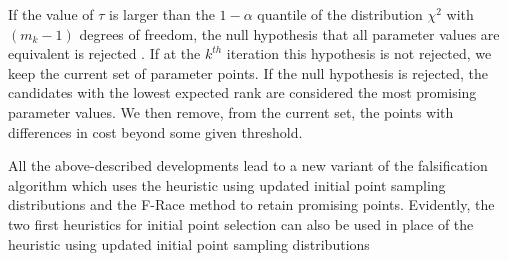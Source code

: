 If the value of $\tau$ is larger than the $1 - \alpha$ quantile of the distribution $\chi^2$  with $(m_k - 1)$ degrees of freedom, the null hypothesis that all parameter values are equivalent is rejected \cite{AP91}. If at the $k^{th}$ iteration this hypothesis is not rejected, we keep the current set of parameter points. If the null hypothesis is rejected, the candidates with the lowest expected rank are considered the most promising parameter values. We then remove, from the current set, the points with differences in cost beyond some given threshold.  
 
All the above-described developments lead to a new variant of the falsification algorithm which uses the heuristic using updated initial point sampling distributions and the F-Race method to retain promising points. Evidently, the two first heuristics for initial point selection can also be used in place of the heuristic using updated initial point sampling distributions%

